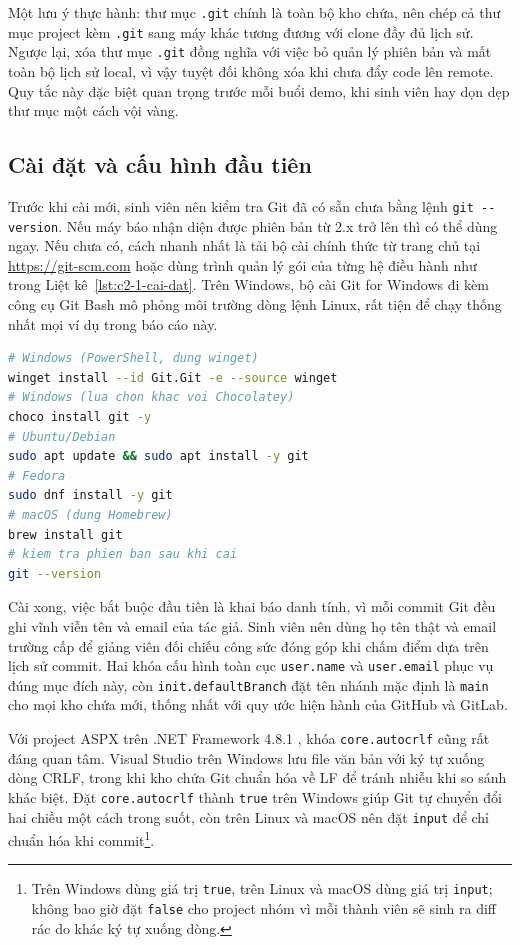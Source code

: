 Một lưu ý thực hành: thư mục \texttt{.git} chính là toàn bộ kho chứa, nên chép cả thư mục project kèm \texttt{.git} sang máy khác tương đương với clone đầy đủ lịch sử. Ngược lại, xóa thư mục \texttt{.git} đồng nghĩa với việc bỏ quản lý phiên bản và mất toàn bộ lịch sử local, vì vậy tuyệt đối không xóa khi chưa đẩy code lên remote. Quy tắc này đặc biệt quan trọng trước mỗi buổi demo, khi sinh viên hay dọn dẹp thư mục một cách vội vàng.

\subsection{Cài đặt và cấu hình đầu tiên}
\label{subsec:c2-1-cai-dat}

Trước khi cài mới, sinh viên nên kiểm tra Git đã có sẵn chưa bằng lệnh \verb|git --version|. Nếu máy báo nhận diện được phiên bản từ 2.x trở lên thì có thể dùng ngay. Nếu chưa có, cách nhanh nhất là tải bộ cài chính thức từ trang chủ tại \url{https://git-scm.com} hoặc dùng trình quản lý gói của từng hệ điều hành như trong Liệt kê~\ref{lst:c2-1-cai-dat}. Trên Windows, bộ cài Git for Windows đi kèm công cụ Git Bash mô phỏng môi trường dòng lệnh Linux, rất tiện để chạy thống nhất mọi ví dụ trong báo cáo này.

\begin{lstlisting}[language=bash, caption={Cài đặt Git trên Windows, Linux và macOS}, label={lst:c2-1-cai-dat}]
# Windows (PowerShell, dung winget)
winget install --id Git.Git -e --source winget
# Windows (lua chon khac voi Chocolatey)
choco install git -y
# Ubuntu/Debian
sudo apt update && sudo apt install -y git
# Fedora
sudo dnf install -y git
# macOS (dung Homebrew)
brew install git
# kiem tra phien ban sau khi cai
git --version
\end{lstlisting}

Cài xong, việc bắt buộc đầu tiên là khai báo danh tính, vì mỗi commit Git đều ghi vĩnh viễn tên và email của tác giả. Sinh viên nên dùng họ tên thật và email trường cấp để giảng viên đối chiếu công sức đóng góp khi chấm điểm dựa trên lịch sử commit. Hai khóa cấu hình toàn cục \verb|user.name| và \verb|user.email| phục vụ đúng mục đích này, còn \verb|init.defaultBranch| đặt tên nhánh mặc định là \texttt{main} cho mọi kho chứa mới, thống nhất với quy ước hiện hành của GitHub và GitLab.

Với project ASPX trên .NET Framework 4.8.1 \cite{msnetfx}, khóa \verb|core.autocrlf| cũng rất đáng quan tâm. Visual Studio trên Windows lưu file văn bản với ký tự xuống dòng CRLF, trong khi kho chứa Git chuẩn hóa về LF để tránh nhiễu khi so sánh khác biệt. Đặt \verb|core.autocrlf| thành \texttt{true} trên Windows giúp Git tự chuyển đổi hai chiều một cách trong suốt, còn trên Linux và macOS nên đặt \texttt{input} để chỉ chuẩn hóa khi commit\footnote{Trên Windows dùng giá trị \texttt{true}, trên Linux và macOS dùng giá trị \texttt{input}; không bao giờ đặt \texttt{false} cho project nhóm vì mỗi thành viên sẽ sinh ra diff rác do khác ký tự xuống dòng.}.

